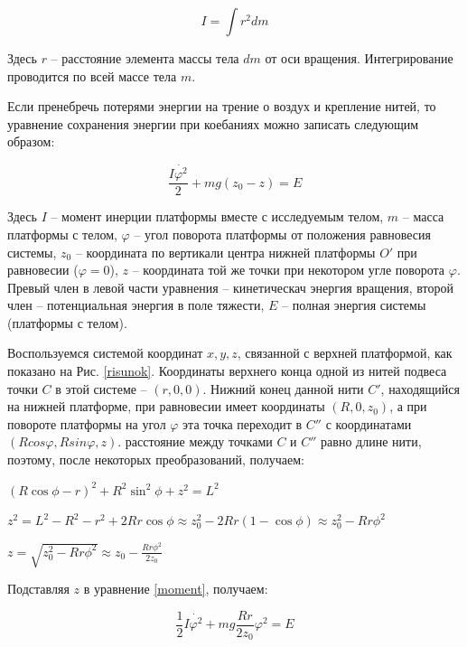 \documentclass[a4paper,12pt]{article}
\begin{document}
	\begin{equation}
		I = \int r^2 dm
	\end{equation}
	
	Здесь $r$ -- расстояние элемента массы тела $dm$ от оси вращения. Интегрирование проводится по всей массе тела $m$.
	
	Если пренебречь потерями энергии на трение о воздух и крепление нитей, то уравнение сохранения энергии при коебаниях можно записать следующим образом:
	
	\begin{equation}\label{moment}
		\frac{I \dot{\varphi^2}}{2} + mg(z_0-z) = E
	\end{equation}
	
	Здесь $I$ -- момент инерции платформы вместе с исследуемым телом, $m$ -- масса платформы с телом, $\varphi$ -- угол поворота платформы от положения равновесия системы, $z_0$ -- координата по вертикали центра нижней платформы $O'$  при равновесии ($\varphi = 0$), $z$ -- координата той же точки при некотором угле поворота $\varphi$. Превый член в левой части уравнения -- кинетическач энергия вращения, второй член -- потенциальная энергия в поле тяжести, $E$ -- полная энергия системы (платформы с телом).
	
	Воспользуемся системой координат $x, y, z$, связанной с верхней платформой, как показано на Рис. \ref{risunok}. Координаты верхнего конца одной из нитей подвеса точки $C$ в этой системе -- $(r, 0, 0)$. Нижний конец данной нити $C'$, находящийся на нижней платформе, при равновесии имеет координаты $(R, 0, z_0)$, а при повороте платформы на угол $\varphi$ эта точка переходит в $C''$ с координатами $(Rcos\varphi, Rsin\varphi, z)$. расстояние между точками $C$ и $C''$ равно длине нити, поэтому, после некоторых преобразований, получаем: 
	
	\begin{center}
	\begin{spacing}{1.6}
		$ (R\cos\phi - r)^2 + R^2\sin^2\phi + z^2 = L^2 $
		
		$ z^2 = L^2 - R^2 - r^2 + 2Rr\cos\phi \approx z^2_{0} - 2Rr(1 - \cos\phi) \approx z^2_{0} - Rr\phi^2 $
		
		$ z = \sqrt{z^2_{0} - Rr\phi^2} \approx z_{0} - \frac{Rr\phi^2}{2z_{0}} $
	\end{spacing}
	\end{center}

	Подставляя $z$ в уравнение \eqref{moment}, получаем:
	
	\begin{equation}
		\frac{1}{2}I\dot{\varphi^2} + mg \frac{Rr}{2z_0}\varphi^2 = E
	\end{equation}
	
\end{document}
